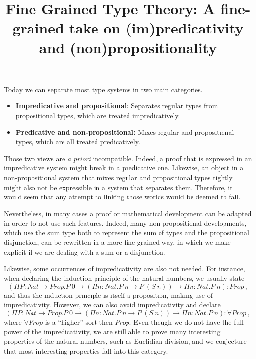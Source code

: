 \documentclass[]{template}
\title{Fine Grained Type Theory: A fine-grained take on (im)predicativity and (non)propositionality}
\begin{document}
 
\maketitle

Today we can separate most type systems in two main categories.
\begin{itemize}
\item \textbf{Impredicative and propositional:} Separates regular types from propositional types, which are treated impredicatively.
\item \textbf{Predicative and non-propositional:} Mixes regular and propositional types, which are all treated predicatively. 
\end{itemize}

Those two views are \textit{a priori} incompatible. Indeed, a proof that is expressed in an impredicative system might break in a predicative one. Likewise, an object in a non-propositional system that mixes regular and propositional types tightly might also not be expressible in a system that separates them. Therefore, it would seem that any attempt to linking those worlds would be deemed to fail.

Nevertheless, in many cases a proof or mathematical development can be adapted in order to not use such features. Indeed, many  non-propositional developments, which use the sum type both to represent the sum of types and the propositional disjunction, can be rewritten in a more fine-grained way, in which we make explicit if we are dealing with a sum or a disjunction.


Likewise, some occurrences of impredicativity are also not needed. For instance, when declaring the induction principle of the natural numbers, we usually state\[
(\Pi P : Nat \to Prop. P~0 \to (\Pi n : Nat. P~n \to P~(S~n)) \to \Pi n : Nat. P~n) : Prop
\,,\]and thus the induction principle is itself a proposition, making use of impredicativity. However, we can also avoid impredicativity and declare \[
(\Pi P : Nat \to Prop. P~0 \to (\Pi n : Nat. P~n \to P~(S~n)) \to \Pi n : Nat. P~n) : \forall Prop
\,,\] where $ \forall Prop $ is a ``higher'' sort then $ Prop $. Even though we do not have the full power of the impredicativity, we are still able to prove many interesting properties of the natural numbers, such as Euclidian division, and we conjecture that most interesting properties fall into this category.
\end{document}
